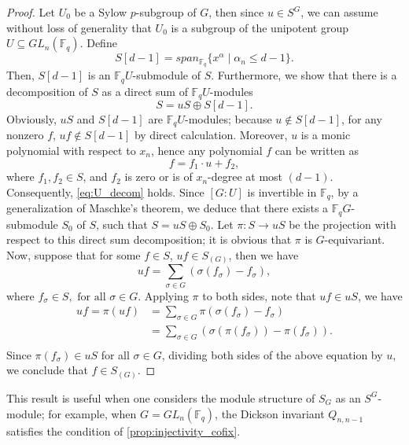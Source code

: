 \documentclass[12pt,a4paper]{report}
\theoremstyle{definition}
\theoremstyle{remark}
\theoremstyle{definition}
\begin{document}
\begin{proof}
    Let $U_0$ be a Sylow $p$-subgroup of $G$, then since $u\in S^G$, we can assume without loss of generality that $U_0$ is a subgroup of the unipotent group $U\subseteq GL_n(\mathbb{F}_q)$. Define
    \begin{equation*}
        S[d-1] = span_{\mathbb{F}_q}\{x^{\alpha}\mid \alpha_n\leq d-1\}.
    \end{equation*}
    Then, $S[d-1]$ is an $\mathbb{F}_q U$-submodule of $S$. Furthermore, we show that there is a decomposition of $S$ as a direct sum of $\mathbb{F}_q U$-modules 
    \begin{equation*}
        S = uS\oplus S[d-1].
    \end{equation*}
    Obviously, $uS$ and $S[d-1]$ are $\mathbb{F}_q U$-modules; because $u\notin S[d-1]$, for any nonzero $f$, $uf\notin S[d-1]$ by direct calculation. Moreover, $u$ is a monic polynomial with respect to $x_n$, hence any polynomial $f$ can be written as
    \begin{equation}\label{eq:U_decom}
        f = f_1 \cdot u + f_2, 
    \end{equation}
    where $f_1, f_2\in S$, and $f_2$ is zero or is of $x_n$-degree at most $(d-1)$. Consequently, \eqref{eq:U_decom} holds. Since $[G:U]$ is invertible in $\mathbb{F}_q$, by a generalization of Maschke's theorem, we deduce that there exists a $\mathbb{F}_q G$-submodule $S_0$ of $S$, such that $S = uS \oplus S_0$. Let $\pi: S\to uS$ be the projection with respect to this direct sum decomposition; it is obvious that $\pi$ is $G$-equivariant. Now, suppose that for some $f\in S$, $uf\in S_{(G)}$, then we have
    \begin{equation*}
        uf = \sum\limits_{\sigma\in G}(\sigma(f_{\sigma}) - f_{\sigma}),
    \end{equation*}
    where $f_{\sigma}\in S, \text{ for all } \sigma\in G$. Applying $\pi$ to both sides, note that $uf\in uS$, we have
    \begin{align*}
        uf = \pi(uf) &= \sum\limits_{\sigma\in G}\pi(\sigma(f_{\sigma}) - f_{\sigma})\\
        &=\sum\limits_{\sigma\in G}(\sigma(\pi(f_{\sigma})) - \pi(f_{\sigma})).\\
    \end{align*}
    Since $\pi(f_{\sigma})\in uS$ for all $\sigma\in G$, dividing both sides of the above equation by $u$, we conclude that $f\in S_{(G)}$. 
\end{proof}
This result is useful when one considers the module structure of $S_G$ as an $S^G$-module; for example, when $G = GL_n(\mathbb{F}_q)$, the Dickson invariant $Q_{n, n-1}$ satisfies the condition of \cref{prop:injectivity_cofix}.\smallbreak
\end{document}
